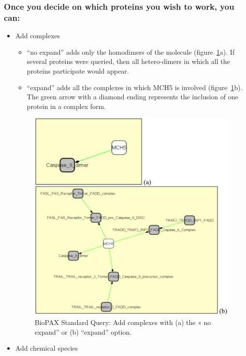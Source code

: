 \subsubsection{Once you decide on which proteins you wish to work, you can:}
\begin{itemize}
\item Add complexes
\begin{itemize}
\item “no expand” adds only the homodimers of the molecule (figure~\ref{Standard_Query_Add_complexes}a). If several proteins were queried, then all hetero-dimers in which all the proteins participate would appear.
\item “expand” adds all the complexes in which MCH5 is involved (figure~\ref{Standard_Query_Add_complexes}b). The green arrow with a diamond ending represents the inclusion of one protein in a complex form.
\end{itemize}
\begin{figure}[h]
\centering
\includegraphics[width=18 cm]{graphics/Standard_Query_Add_complexes}
\caption{BioPAX Standard Query: Add complexes with (a) the « no expand” or (b) “expand” option.}
\label{Standard_Query_Add_complexes}
\end{figure}
\item Add chemical species\\

\end{itemize}
